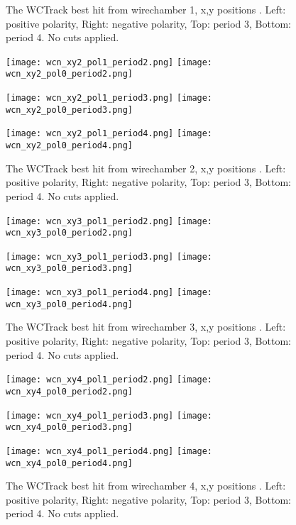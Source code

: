 \begin{description}
{\begin{figure}[h]
   \caption[short]{The WCTrack  best hit from wirechamber 1,  x,y positions . Left: positive polarity, Right: negative polarity, Top: period 3, Bottom: period 4. No cuts applied.}
   \label{fig_xy1}
  \end{figure}
  
  
         \begin{figure}[h]	   
        	\texttt{[image: wcn\_xy2\_pol1\_period2.png]}
	 \texttt{[image: wcn\_xy2\_pol0\_period2.png]}
	 
        	\texttt{[image: wcn\_xy2\_pol1\_period3.png]}
	 \texttt{[image: wcn\_xy2\_pol0\_period3.png]}
	 
	 \texttt{[image: wcn\_xy2\_pol1\_period4.png]}
	 \texttt{[image: wcn\_xy2\_pol0\_period4.png]}
	 
   \caption[short]{The WCTrack  best hit from wirechamber 2,  x,y positions . Left: positive polarity, Right: negative polarity, Top: period 3, Bottom: period 4. No cuts applied.}
   \label{fig_mey}
  \end{figure}
  
  
         \begin{figure}[h]	   
        	\texttt{[image: wcn\_xy3\_pol1\_period2.png]}
	 \texttt{[image: wcn\_xy3\_pol0\_period2.png]}
	 
        	\texttt{[image: wcn\_xy3\_pol1\_period3.png]}
	 \texttt{[image: wcn\_xy3\_pol0\_period3.png]}
	 
	 \texttt{[image: wcn\_xy3\_pol1\_period4.png]}
	 \texttt{[image: wcn\_xy3\_pol0\_period4.png]}
	 
   \caption[short]{The WCTrack  best hit from wirechamber 3,  x,y positions . Left: positive polarity, Right: negative polarity, Top: period 3, Bottom: period 4. No cuts applied.}
   \label{fig_mey}
  \end{figure}
  
  
         \begin{figure}[h]	   
        	\texttt{[image: wcn\_xy4\_pol1\_period2.png]}
	 \texttt{[image: wcn\_xy4\_pol0\_period2.png]}
	 
        	\texttt{[image: wcn\_xy4\_pol1\_period3.png]}
	 \texttt{[image: wcn\_xy4\_pol0\_period3.png]}
	 
	 \texttt{[image: wcn\_xy4\_pol1\_period4.png]}
	 \texttt{[image: wcn\_xy4\_pol0\_period4.png]}
	 
   \caption[short]{The WCTrack  best hit from wirechamber 4,  x,y positions . Left: positive polarity, Right: negative polarity, Top: period 3, Bottom: period 4. No cuts applied.}
   \label{fig_mey}
  \end{figure}
  



}
\end{description}
